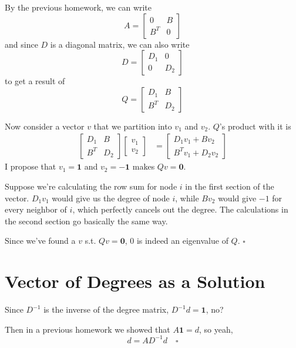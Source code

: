 \documentclass[12pt]{article}
\begin{document}
By the previous homework, we can write
\[A=\begin{bmatrix}
            0   & B \\
            B^T & 0
      \end{bmatrix}\]
and since $D$ is a diagonal matrix, we can also write
\[D=\begin{bmatrix}
            D_1 & 0   \\
            0   & D_2
      \end{bmatrix}\]
to get a result of
\[Q=\begin{bmatrix}
            D_1 & B   \\
            B^T & D_2
      \end{bmatrix}\]

Now consider a vector $v$ that we partition into $v_1$ and $v_2$.
$Q$'s product with it is
\begin{align*}
      \begin{bmatrix}
            D_1 & B   \\
            B^T & D_2
      \end{bmatrix}\begin{bmatrix}
                         v_1 \\ v_2
                   \end{bmatrix}
       & = \begin{bmatrix}
                 D_1v_1+Bv_2 \\
                 B^Tv_1+D_2v_2
           \end{bmatrix}
\end{align*}
I propose that $v_1=\mathbf{1}$ and $v_2=-\mathbf{1}$ makes $Qv=\mathbf{0}$.

Suppose we're calculating the row sum for node $i$ in the first section of the vector.
$D_1v_1$ would give us the degree of node $i$, while $Bv_2$ would give
$-1$ for every neighbor of $i$, which perfectly cancels out the degree.
The calculations in the second section go basically the same way.

Since we've found a $v$ s.t. $Qv=\mathbf{0}$, $0$ is indeed an eigenvalue of $Q$. $\square$

\section{Vector of Degrees as a Solution}

Since $D^{-1}$ is the inverse of the degree matrix, $D^{-1}d=\mathbf{1}$, no?

Then in a previous homework we showed that $A\mathbf{1}=d$, so yeah,
\[d=AD^{-1}d\quad\square\]
\end{document}
